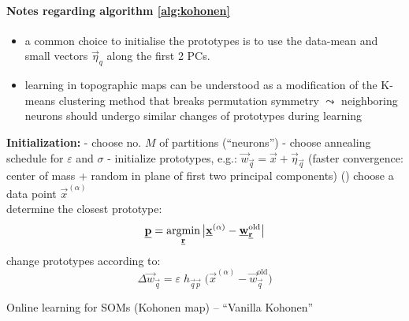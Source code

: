 \paragraph{Notes regarding algorithm \ref{alg:kohonen}} 
\begin{itemize}
\item a common choice to initialise the prototypes is to use the
  data-mean and small vectors $\vec{\eta}_q$ along the first 2 PCs.
\item learning in topographic maps can be understood as a modification
  of the K-means clustering method that breaks permutation symmetry
  $\leadsto$ neighboring neurons should undergo similar changes of
  prototypes during learning
\end{itemize}
\begin{algorithm}
\DontPrintSemicolon  
\textbf{Initialization:} \;
- choose no. $M$ of partitions (``neurons'')\;
- choose annealing schedule for $\varepsilon$ and $\sigma$\;
- initialize prototypes, e.g.:  $\vec{w}_{\vec q} = \vec{x} + \vec{\eta}_{\vec q}$ (faster convergence: center of mass + random in plane of first two principal components) \;
\Begin(){
  choose a data point $\vec{x}^{(\alpha)}$ \\
  determine the closest prototype:
  \[ \vec{p} = \argmin_{\vec r} \big| \vec{x}^{(\alpha)} - 
  \vec{w}_{\vec r}^{\mathrm{old}} \big|
  \]
  change prototypes according to:
  \[ \Delta \vec{w}_{\vec q} = \varepsilon \; h_{\vec{q} \vec{p}} \;
  \big( \vec{x}^{(\alpha)} - \vec{w}_{\vec q}^{\mathrm{old}} \big)
  \]
}
\label{alg:kohonen}
\caption{Online learning for SOMs (Kohonen map) -- ``Vanilla Kohonen''}
\end{algorithm}

